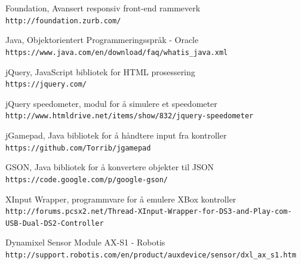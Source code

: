 \documentclass[12pt]{report}
\begin{document}
\begin{thebibliography}{3}
	Foundation, Avansert responsiv front-end rammeverk
	\\\texttt{http://foundation.zurb.com/}

	Java, Objektorientert Programmeringsspråk - Oracle
	\\\texttt{https://www.java.com/en/download/faq/whatis\_java.xml}
	
	jQuery, JavaScript bibliotek for HTML prosessering
	\\\texttt{https://jquery.com/}

	jQuery speedometer, modul for å simulere et speedometer
	\\\texttt{http://www.htmldrive.net/items/show/832/jquery-speedometer}

	jGamepad, Java bibliotek for å håndtere input fra kontroller
	\\\texttt{https://github.com/Torrib/jgamepad}

	GSON, Java bibliotek for å konvertere objekter til JSON
	\\\texttt{https://code.google.com/p/google-gson/}

	XInput Wrapper, programmvare for å emulere XBox kontroller
	\\\texttt{http://forums.pcsx2.net/Thread-XInput-Wrapper-for-DS3-and-Play-com-USB-Dual-DS2-Controller}
	
	Dynamixel Sensor Module AX-S1 - Robotis
	\\\texttt{http://support.robotis.com/en/product/auxdevice/sensor/dxl\_ax\_s1.htm}

\end{thebibliography}

\clearpage

\medskip
\end{document}
